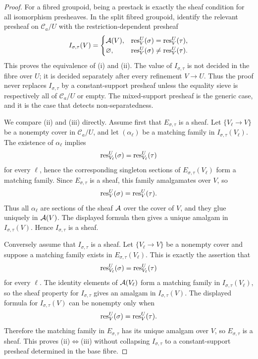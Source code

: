 \begin{proof}
For a fibred groupoid, being a prestack is exactly the sheaf condition for all isomorphism presheaves. In the split fibred groupoid,  identify the relevant presheaf on $\mathcal C_a/U$ with the restriction-dependent presheaf
\[
I_{\sigma,\tau}(V)=
\begin{cases}
\mathcal{A}(V), & \mathrm{res}_V^U(\sigma)=\mathrm{res}_V^U(\tau),\\
\varnothing, & \mathrm{res}_V^U(\sigma)\neq\mathrm{res}_V^U(\tau).
\end{cases}
\]
This proves the equivalence of \textup{(i)} and \textup{(ii)}. The value of $I_{\sigma,\tau}$ is not decided in the fibre over $U$; it is decided separately after every refinement $V\to U$. Thus the proof never replaces $I_{\sigma,\tau}$ by a constant-support presheaf unless the equality sieve is respectively all of $\mathcal C_a/U$ or empty. The mixed-support presheaf is the generic case, and it is the case that detects non-separatedness.

We compare \textup{(ii)} and \textup{(iii)} directly. Assume first that $E_{\sigma,\tau}$ is a sheaf. Let $\{V_\ell\to V\}$ be a nonempty cover in $\mathcal C_a/U$, and let $(\alpha_\ell)$ be a matching family in $I_{\sigma,\tau}(V_\ell)$. The existence of $\alpha_\ell$ implies
\[
\mathrm{res}_{V_\ell}^U(\sigma)=\mathrm{res}_{V_\ell}^U(\tau)
\]
for every $\ell$, hence the corresponding singleton sections of $E_{\sigma,\tau}(V_\ell)$ form a matching family. Since $E_{\sigma,\tau}$ is a sheaf, this family amalgamates over $V$, so
\[
\mathrm{res}_V^U(\sigma)=\mathrm{res}_V^U(\tau).
\]
Thus all $\alpha_\ell$ are sections of the sheaf $\mathcal{A}$ over the cover of $V$, and they glue uniquely in $\mathcal{A}(V)$. The displayed formula then gives a unique amalgam in $I_{\sigma,\tau}(V)$. Hence $I_{\sigma,\tau}$ is a sheaf.

Conversely assume that $I_{\sigma,\tau}$ is a sheaf. Let $\{V_\ell\to V\}$ be a nonempty cover and suppose a matching family exists in $E_{\sigma,\tau}(V_\ell)$. This is exactly the assertion that
\[
\mathrm{res}_{V_\ell}^U(\sigma)=\mathrm{res}_{V_\ell}^U(\tau)
\]
for every $\ell$. The identity elements of $\mathcal{A}(V_\ell)$ form a matching family in $I_{\sigma,\tau}(V_\ell)$, so the sheaf property for $I_{\sigma,\tau}$ gives an amalgam in $I_{\sigma,\tau}(V)$. The displayed formula for $I_{\sigma,\tau}(V)$ can be nonempty only when
\[
\mathrm{res}_V^U(\sigma)=\mathrm{res}_V^U(\tau).
\]
Therefore the matching family in $E_{\sigma,\tau}$ has its unique amalgam over $V$, so $E_{\sigma,\tau}$ is a sheaf. This proves \textup{(ii)}$\Leftrightarrow$\textup{(iii)} without collapsing $I_{\sigma,\tau}$ to a constant-support presheaf determined in the base fibre.


\end{proof}
